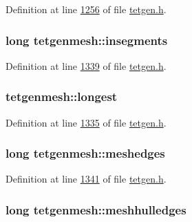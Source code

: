 Definition at line \hyperlink{tetgen_8h_source_l01256}{1256} of file \hyperlink{tetgen_8h_source}{tetgen.\+h}.

\subsubsection[{\texorpdfstring{insegments}{insegments}}]{\setlength{\rightskip}{0pt plus 5cm}long tetgenmesh\+::insegments}\hypertarget{classtetgenmesh_ac8db017efd7580061843ad9de059194e}{}\label{classtetgenmesh_ac8db017efd7580061843ad9de059194e}


Definition at line \hyperlink{tetgen_8h_source_l01339}{1339} of file \hyperlink{tetgen_8h_source}{tetgen.\+h}.

\subsubsection[{\texorpdfstring{longest}{longest}}]{ tetgenmesh\+::longest}\hypertarget{classtetgenmesh_af74416d37dea90827a96b28d144177bf}{}\label{classtetgenmesh_af74416d37dea90827a96b28d144177bf}


Definition at line \hyperlink{tetgen_8h_source_l01335}{1335} of file \hyperlink{tetgen_8h_source}{tetgen.\+h}.

\subsubsection[{\texorpdfstring{meshedges}{meshedges}}]{\setlength{\rightskip}{0pt plus 5cm}long tetgenmesh\+::meshedges}\hypertarget{classtetgenmesh_a1ee0dc17e072db0067182d778f53a288}{}\label{classtetgenmesh_a1ee0dc17e072db0067182d778f53a288}


Definition at line \hyperlink{tetgen_8h_source_l01341}{1341} of file \hyperlink{tetgen_8h_source}{tetgen.\+h}.

\subsubsection[{\texorpdfstring{meshhulledges}{meshhulledges}}]{\setlength{\rightskip}{0pt plus 5cm}long tetgenmesh\+::meshhulledges}\hypertarget{classtetgenmesh_a3b6b4c6760ec4d19b69cc1f504486e98}{}\label{classtetgenmesh_a3b6b4c6760ec4d19b69cc1f504486e98}



